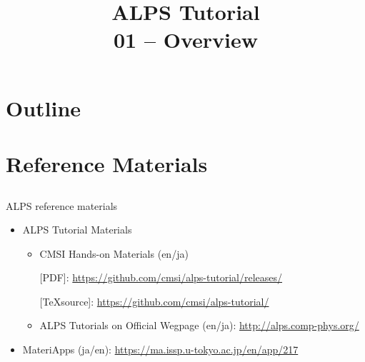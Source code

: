 
\title{ALPS Tutorial \\ 01 -- Overview}




\begin{frame}
  \titlepage
\end{frame}

\section*{Outline}
\begin{frame}[t,fragile]
  \tableofcontents
\end{frame}

\section{Reference Materials}
\subsection*{\redb\whiteb\greenb}

\begin{frame}[t,fragile]{ALPS reference materials}
  \begin{itemize}
    \setlength{\itemsep}{1em}
  \item ALPS Tutorial Materials
    \begin{itemize}
    \item CMSI Hands-on Materials (en/ja)
      
      [PDF]: {\footnotesize \url{https://github.com/cmsi/alps-tutorial/releases/}}
      
      [\TeX source]: {\footnotesize \url{https://github.com/cmsi/alps-tutorial/}}
      
    \item ALPS Tutorials on Official Wegpage (en/ja): {\footnotesize \url{http://alps.comp-phys.org/}}
    \end{itemize}
  \item MateriApps (ja/en): {\footnotesize \url{https://ma.issp.u-tokyo.ac.jp/en/app/217}}
  \end{itemize}
\end{frame}

